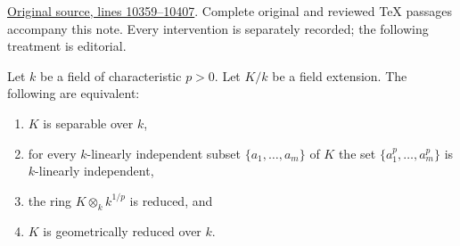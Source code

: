 \hypertarget{algebra-context-121}{}

\noindent\href{https://github.com/stacks/stacks-project/blob/a04446e57ec1fbc252a871afcec7752fb2807b14/algebra.tex\#L10359}{Original source, lines 10359--10407}. Complete original and reviewed TeX passages accompany this note. Every intervention is separately recorded; the following treatment is editorial.


\begin{lemma}
\label{editorial-source-lemma-characterize-separable-field-extensions}
Let $k$ be a field of characteristic $p > 0$.
Let $K/k$ be a field extension.
The following are equivalent:
\begin{enumerate}
\item $K$ is separable over $k$,
\item for every $k$-linearly independent subset $\{a_1, \ldots, a_m\}$
of $K$ the set $\{a^p_1, \ldots, a_m^p\}$ is $k$-linearly independent,
\item the ring $K \otimes_k k^{1/p}$ is reduced, and
\item $K$ is geometrically reduced over $k$.
\end{enumerate}
\end{lemma}

